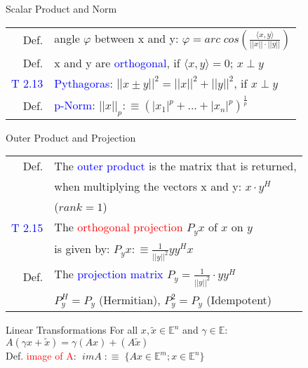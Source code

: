 \begin{mainbox}{Scalar Product and Norm}
\begin{tabular}{rrl}
	\rule{0pt}{3ex}
	Def. & \multicolumn{2}{l}{angle $\varphi$ between x and y: $\varphi = arc\;cos\left(\frac{\langle x,y\rangle}{||x||\cdot ||y||}\right)$}\\
	\rule{0pt}{3ex}
	Def. & \multicolumn{2}{l}{x and y are \textcolor{blue}{orthogonal}, if $\langle x,y\rangle = 0$; $x \perp y$}\\
	\rule{0pt}{3ex}
	\textcolor{blue}{T 2.13} & \multicolumn{2}{l}{\textcolor{blue}{Pythagoras}: $||x \pm y||^2 = ||x||^2 + ||y||^2$, if $x \perp y$}\\
	\rule{0pt}{3ex}	
	Def. & \multicolumn{2}{l}{\textcolor{blue}{p-Norm}: $||x||_p :\equiv (|x_1|^p + ... + |x_n|^p)^{\frac{1}{p}}$}\\
\end{tabular}
\end{mainbox}

\begin{mainbox}{Outer Product and Projection}
\setlength{\tabcolsep}{2pt}
\begin{tabular}{rl}
	Def. & The \textcolor{blue}{outer product} is the matrix that is returned,\\
	& when multiplying the vectors x and y: $x\cdot y^H$\\
	& ($rank = 1$)\\
	\rule{0pt}{3ex}
	\textcolor{blue}{T 2.15} & The \textcolor{red}{orthogonal projection} $P_yx$ of $x$ on $y$\\
	& is given by: $P_yx :\equiv \frac{1}{||y||^2}yy^Hx$\\
	\rule{0pt}{3ex}
	Def. & The \textcolor{blue}{projection matrix} $P_y = \frac{1}{||y||^2}\cdot yy^H$\\
	& $P_y^H = P_y$ (Hermitian), $P_y^2 = P_y$ (Idempotent)\\
\end{tabular}

\end{mainbox}

\begin{mainbox}{Linear Transformations}
For all $x, \tilde{x} \in \mathbb{E}^n$ and $\gamma \in \mathbb{E}$:\\
$A(\gamma x + \tilde{x}) = \gamma (Ax) + (A\tilde{x})$
\smallskip\\
Def. \textcolor{red}{image of A}: $\;imA\;:\equiv\;\{Ax\in \mathbb{E}^m; x\in \mathbb{E}^n\}$\\
\end{mainbox}

